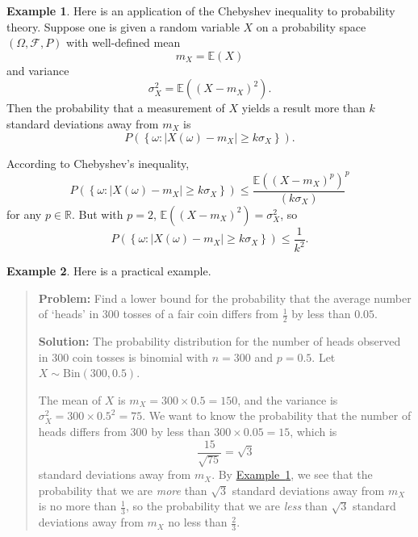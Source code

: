 \documentclass[a4paper,12pt]{scrreprt}
\newcommand{\R}{\mathbb{R}}
\theoremstyle{definition}
\newtheorem{example}{Example}[section]
\theoremstyle{plain}
\theoremstyle{remark}
\begin{document}
\begin{example}
  \label{eg:chebyshevinequalityandprobability}
  Here is an application of the Chebyshev inequality to probability theory. Suppose one is given a random variable $X$ on a probability space $(\Omega, \mathcal{F}, P)$ with well-defined mean
  \begin{equation*}
    m_{X} = \mathbb{E}(X)
  \end{equation*}
  and variance
  \begin{equation*}
    \sigma_{X}^{2} = \mathbb{E}\left( {(X - m_{X})}^{2} \right).
  \end{equation*}
  Then the probability that a measurement of $X$ yields a result more than $k$ standard deviations away from $m_{X}$ is
  \begin{equation*}
    P(\left\{ \omega\colon \left| X(\omega) - m_{X} \right| \geq k\sigma_{X} \right\}).
  \end{equation*}

  According to Chebyshev's inequality,
  \begin{equation*}
    P(\left\{ \omega\colon \left| X(\omega) - m_{X} \right| \geq k\sigma_{X} \right\}) \leq  \frac{\mathbb{E}({(X - m_{X})}^{p})}{(k\sigma_{X})}^{p}
  \end{equation*}
  for any $p \in \R$. But with $p = 2$, $\mathbb{E}({(X - m_{X})}^{2}) = \sigma_{X}^{2}$, so
  \begin{equation*}
    P(\left\{ \omega\colon \left| X(\omega) - m_{X} \right| \geq k\sigma_{X} \right\}) \leq \frac{1}{k^{2}}.
  \end{equation*}
\end{example}

\begin{example}
  Here is a practical example.
  \begin{quote}
    \textbf{Problem:} Find a lower bound for the probability that the average number of `heads' in 300 tosses of a fair coin differs from $\frac{1}{2}$ by less than $0.05$.

    \textbf{Solution:} The probability distribution for the number of heads observed in 300 coin tosses is binomial with $n = 300$ and $p = 0.5$. Let $X \sim \mathrm{Bin}(300, 0.5)$.

    The mean of $X$ is $m_{X} = 300 \times 0.5 = 150$, and the variance is $\sigma_{X}^{2} = 300\times 0.5^{2} = 75$. We want to know the probability that the number of heads differs from 300 by less than $300 \times 0.05 = 15$, which is
    \begin{equation*}
      \frac{15}{\sqrt{75}} = \sqrt{3}
    \end{equation*}
    standard deviations away from $m_{X}$. By \hyperref[eg:chebyshevinequalityandprobability]{Example~\ref*{eg:chebyshevinequalityandprobability}}, we see that the probability that we are \emph{more} than $\sqrt{3}$ standard deviations away from $m_{X}$ is no more than $\frac{1}{3}$, so the probability that we are \emph{less} than $\sqrt{3}$ standard deviations away from $m_{X}$ no less than $\frac{2}{3}$.
  \end{quote}
\end{example}
\end{document}
